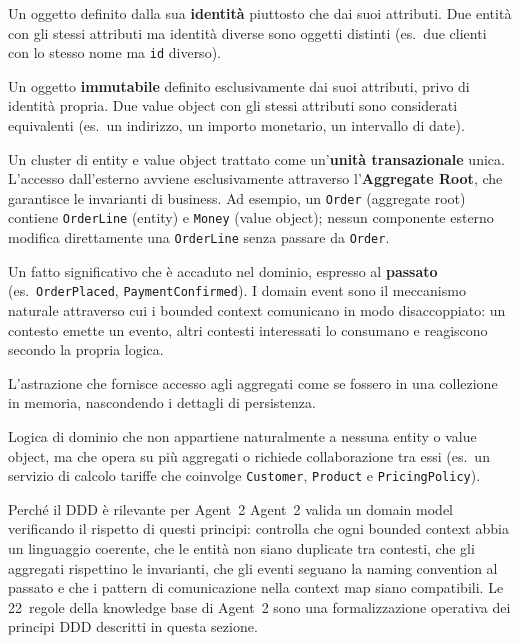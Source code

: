 \documentclass[12pt,a4paper]{report}
\begin{document}
\begin{description}[style=nextline, leftmargin=1.5cm]
  \item[\textsf{Entity}]
    Un oggetto definito dalla sua \textbf{identità} piuttosto che dai suoi
    attributi. Due entità con gli stessi attributi ma identità diverse sono oggetti
    distinti (es.\ due clienti con lo stesso nome ma \texttt{id} diverso).

  \item[\textsf{Value Object}]
    Un oggetto \textbf{immutabile} definito esclusivamente dai suoi attributi, privo
    di identità propria. Due value object con gli stessi attributi sono considerati
    equivalenti (es.\ un indirizzo, un importo monetario, un intervallo di date).

  \item[\textsf{Aggregate}]
    Un cluster di entity e value object trattato come un'\textbf{unità transazionale}
    unica. L'accesso dall'esterno avviene esclusivamente attraverso l'\textbf{Aggregate
    Root}, che garantisce le invarianti di business. Ad esempio, un \texttt{Order}
    (aggregate root) contiene \texttt{OrderLine} (entity) e \texttt{Money} (value
    object); nessun componente esterno modifica direttamente una \texttt{OrderLine}
    senza passare da \texttt{Order}.

  \item[\textsf{Domain Event}]
    Un fatto significativo che è accaduto nel dominio, espresso al \textbf{passato}
    (es.\ \texttt{OrderPlaced}, \texttt{PaymentConfirmed}). I domain event sono il
    meccanismo naturale attraverso cui i bounded context comunicano in modo
    disaccoppiato: un contesto emette un evento, altri contesti interessati lo
    consumano e reagiscono secondo la propria logica.

  \item[\textsf{Repository}]
    L'astrazione che fornisce accesso agli aggregati come se fossero in una
    collezione in memoria, nascondendo i dettagli di persistenza.

  \item[\textsf{Domain Service}]
    Logica di dominio che non appartiene naturalmente a nessuna entity o value
    object, ma che opera su più aggregati o richiede collaborazione tra essi
    (es.\ un servizio di calcolo tariffe che coinvolge \texttt{Customer},
    \texttt{Product} e \texttt{PricingPolicy}).
\end{description}

\begin{technicalbox}{Perché il DDD è rilevante per Agent~2}
Agent~2 valida un domain model verificando il rispetto di questi principi:
controlla che ogni bounded context abbia un linguaggio coerente, che le entità
non siano duplicate tra contesti, che gli aggregati rispettino le invarianti,
che gli eventi seguano la naming convention al passato e che i pattern di
comunicazione nella context map siano compatibili. Le 22~regole della knowledge
base di Agent~2 sono una formalizzazione operativa dei principi DDD descritti
in questa sezione.
\end{technicalbox}
\end{document}
